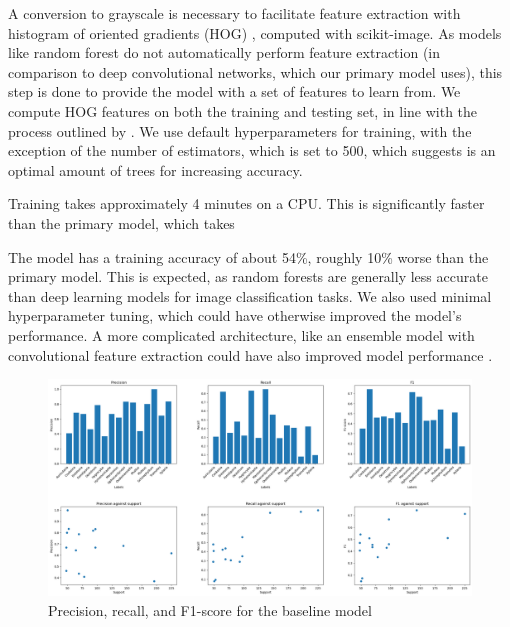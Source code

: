 \documentclass{article} %
\begin{document}
A conversion to grayscale is necessary to facilitate feature extraction with histogram of oriented gradients (HOG) \citep{AbouelnagaThambirajaEtAl.ObjectDetectionHistogram.2018}, computed with scikit-image. As models like random forest do not automatically perform feature extraction (in comparison to deep convolutional networks, which our primary model uses), this step is done to provide the model with a set of features to learn from. We compute HOG features on both the training and testing set, in line with the process outlined by \cite{Shafi.RandomForestClassification.2023}. We use default hyperparameters for training, with the exception of the number of estimators, which is set to 500, which \cite{Xi.ImageClassificationRecognition.2022} suggests is an optimal amount of trees for increasing accuracy.

Training takes approximately 4 minutes on a CPU. This is significantly faster than the primary model, which takes %

The model has a training accuracy of about 54\%, roughly 10\% worse than the primary model. This is expected, as random forests are generally less accurate than deep learning models for image classification tasks. We also used minimal hyperparameter tuning, which could have otherwise improved the model's performance. A more complicated architecture, like an ensemble model with convolutional feature extraction could have also improved model performance \citep{Xi.ImageClassificationRecognition.2022}.

\begin{figure}[h]
    \begin{center}
    \includegraphics[width=1.0\textwidth]{figures/baseline.png}
    \end{center}
    \caption{Precision, recall, and F1-score for the baseline model}
\end{figure}
\end{document}
